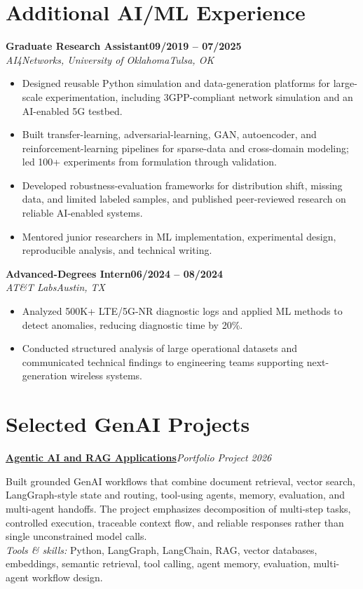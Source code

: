 \documentclass[9pt,letterpaper]{extarticle}
\newcommand{\role}[4]{\Needspace{4\baselineskip}\textbf{#1}\hfill\textbf{#2}\\[-1pt]\textit{#3}\hfill\textit{#4}\par}
\newcommand{\project}[3]{\Needspace{5\baselineskip}\textbf{#1}\hfill\textit{#2 \textbar{} #3}\par}
\begin{document}
\section{Additional AI/ML Experience}
\role{Graduate Research Assistant}{09/2019 -- 07/2025}{AI4Networks, University of Oklahoma}{Tulsa, OK}
\begin{itemize}
\item Designed reusable Python simulation and data-generation platforms for large-scale experimentation, including 3GPP-compliant network simulation and an AI-enabled 5G testbed.
\item Built transfer-learning, adversarial-learning, GAN, autoencoder, and reinforcement-learning pipelines for sparse-data and cross-domain modeling; led 100+ experiments from formulation through validation.
\item Developed robustness-evaluation frameworks for distribution shift, missing data, and limited labeled samples, and published peer-reviewed research on reliable AI-enabled systems.
\item Mentored junior researchers in ML implementation, experimental design, reproducible analysis, and technical writing.
\end{itemize}

\role{Advanced-Degrees Intern}{06/2024 -- 08/2024}{AT\&T Labs}{Austin, TX}
\begin{itemize}
\item Analyzed 500K+ LTE/5G-NR diagnostic logs and applied ML methods to detect anomalies, reducing diagnostic time by 20\%.
\item Conducted structured analysis of large operational datasets and communicated technical findings to engineering teams supporting next-generation wireless systems.
\end{itemize}

\section{Selected GenAI Projects}
\project{\href{https://github.com/WaseemRaza844/agentic-ai-projects-by-was}{Agentic AI and RAG Applications}}{Portfolio Project}{2026}
Built grounded GenAI workflows that combine document retrieval, vector search, LangGraph-style state and routing, tool-using agents, memory, evaluation, and multi-agent handoffs. The project emphasizes decomposition of multi-step tasks, controlled execution, traceable context flow, and reliable responses rather than single unconstrained model calls.\\[-1pt]
{\small\textit{Tools \& skills:} Python, LangGraph, LangChain, RAG, vector databases, embeddings, semantic retrieval, tool calling, agent memory, evaluation, multi-agent workflow design.}
\end{document}
